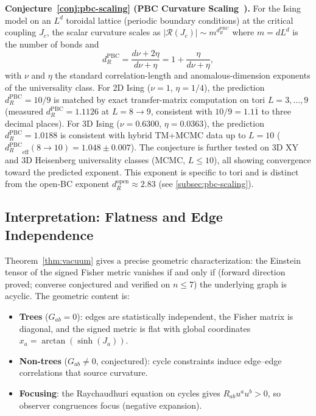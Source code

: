 \documentclass[11pt]{article}
\theoremstyle{definition}
\theoremstyle{remark}
\newcommand{\obs}{u}
\newcommand{\Ein}{G}
\newcommand{\Ric}{R}
\newcommand{\Scal}{\mathcal{R}}
\begin{document}
\medskip
\noindent\textbf{Conjecture~\ref{conj:pbc-scaling} (PBC Curvature Scaling~\cite{PredLetter}).}
For the Ising model on an $L^d$ toroidal lattice (periodic boundary
conditions) at the critical coupling $J_c$, the scalar curvature scales as
$|\Scal(J_c)| \sim m^{d_R^{\mathrm{PBC}}}$ where $m = dL^d$ is the number of bonds and
\begin{equation}
  d_R^{\mathrm{PBC}} = \frac{d\nu + 2\eta}{d\nu + \eta}
  = 1 + \frac{\eta}{d\nu + \eta},
  \label{eq:pbc-dR-intro}
\end{equation}
with $\nu$ and $\eta$ the standard correlation-length and anomalous-dimension
exponents of the universality class.
For 2D Ising ($\nu = 1$, $\eta = 1/4$), the prediction $d_R^{\mathrm{PBC}} = 10/9$
is matched by exact transfer-matrix computation on tori $L = 3, \ldots, 9$
(measured $d_R^{\mathrm{PBC}} = 1.1126$ at $L = 8{\to}9$,
consistent with $10/9 = 1.1\overline{1}$ to three decimal places).
For 3D Ising ($\nu = 0.6300$, $\eta = 0.0363$), the prediction
$d_R^{\mathrm{PBC}} = 1.0188$ is consistent with hybrid TM+MCMC data up to $L = 10$
(${d_R^{\mathrm{PBC}}}_{{\mathrm{eff}}}(8{\to}10) = 1.048 \pm 0.007$).
The conjecture is further tested on 3D XY and 3D Heisenberg universality
classes (MCMC, $L \leq 10$), all showing convergence toward the predicted exponent.
This exponent is specific to tori and is distinct from the open-BC exponent
$d_R^{\mathrm{open}} \approx 2.83$ (see \cref{subsec:pbc-scaling}).

\subsection{Interpretation: Flatness and Edge Independence}

Theorem~\ref{thm:vacuum} gives a precise geometric characterization:
the Einstein tensor of the signed Fisher metric vanishes if and only if
(forward direction proved; converse conjectured and verified on $n \leq 7$)
the underlying graph is acyclic.  The geometric content is:

\begin{itemize}
\item \textbf{Trees} ($\Ein_{ab} = 0$): edges are statistically independent,
  the Fisher matrix is diagonal, and the signed metric is flat with
  global coordinates $x_a = \arctan(\sinh(J_a))$.
\item \textbf{Non-trees} ($\Ein_{ab} \neq 0$, conjectured): cycle constraints
  induce edge--edge correlations that source curvature.
\item \textbf{Focusing}: the Raychaudhuri equation on cycles gives
  $\Ric_{ab}\obs^a\obs^b > 0$, so observer congruences focus
  (negative expansion).
\end{itemize}
\end{document}
